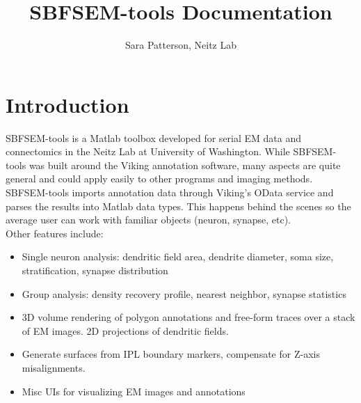 \documentclass[12pt]{exam}
\title{SBFSEM-tools Documentation}
\author{Sara Patterson, Neitz Lab}
\date{\vspace{-5ex}}
\begin{document}
	\maketitle
	\tableofcontents
	\pagebreak
	\section{Introduction}
	SBFSEM-tools is a Matlab toolbox developed for serial EM data and connectomics in the Neitz Lab at University of Washington. While SBFSEM-tools was built around the Viking annotation software, many aspects are quite general and could apply easily to other programs and imaging methods.\\
	SBFSEM-tools imports annotation data through Viking's OData service and parses the results into Matlab data types. This happens behind the scenes so the average user can work with familiar objects (neuron, synapse, etc).\\
	Other features include:
	\begin{itemize}
		\item Single neuron analysis: dendritic field area, dendrite diameter, soma size, stratification, synapse distribution
		\item Group analysis: density recovery profile, nearest neighbor, synapse statistics
		\item 3D volume rendering of polygon annotations and free-form traces over a stack of EM images. 2D projections of dendritic fields.
		\item Generate surfaces from IPL boundary markers, compensate for Z-axis misalignments.
		\item Misc UIs for visualizing EM images and annotations
	\end{itemize}
\end{document}
